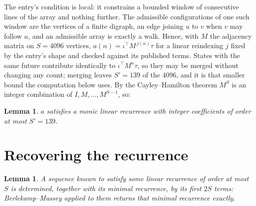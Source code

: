 \documentclass[11pt,a4paper]{article}
\theoremstyle{plain}
\newtheorem{lemma}[theorem]{Lemma}
\theoremstyle{definition}
\begin{document}
The entry's condition is local: it constrains a bounded window of consecutive lines of the
array and nothing further. The admissible configurations of one such window are the vertices
of a finite digraph, an edge joining $u$ to $v$ when $v$ may follow $u$, and an admissible
array is exactly a walk. Hence, with $M$ the adjacency matrix on $S=4096$ vertices,
$a(n)=\iota^{\!\top}M^{\,j(n)}\tau$ for a linear reindexing $j$ fixed by the entry's shape
and checked against its published terms. States with the same future contribute identically to $\iota^{\!\top}M^n\tau$, so they may be merged without changing any count; merging leaves $S'=139$ of the $4096$, and it is that smaller bound the computation below uses. By the Cayley--Hamilton theorem $M^{S}$ is an
integer combination of $I,M,\dots,M^{S-1}$, so:

\begin{lemma}\label{lem:cf}
$a$ satisfies a monic linear recurrence with integer coefficients of order at most
$S'=139$.
\end{lemma}

\section{Recovering the recurrence}

\begin{lemma}\label{lem:bm}
A sequence known to satisfy some linear recurrence of order at most $S$ is determined, together
with its minimal recurrence, by its first $2S$ terms: Berlekamp--Massey applied to them returns
that minimal recurrence exactly.
\end{lemma}
\end{document}
